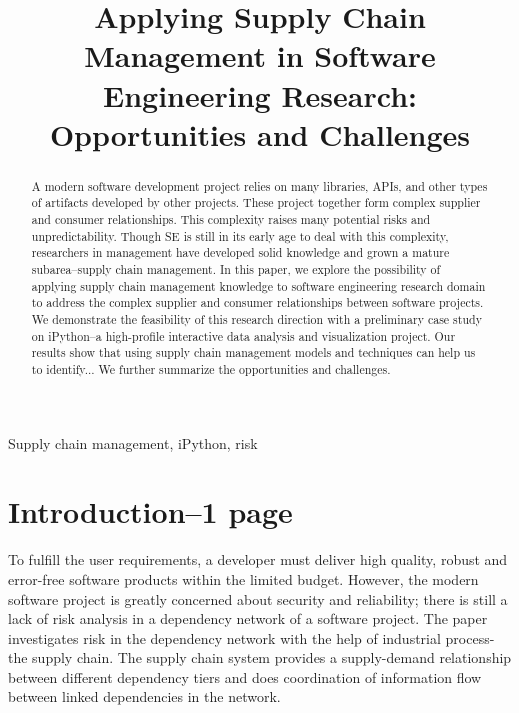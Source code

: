 \documentclass[10pt,conference]{IEEEtran}
\begin{document}
\title{Applying Supply Chain Management in Software Engineering Research: Opportunities and Challenges}
\author{}


\maketitle

\begin{abstract}
A modern software development project relies on many libraries, APIs, and other types of artifacts developed by other projects. These project together form complex supplier and consumer relationships. This complexity raises many potential risks and unpredictability. Though SE is still in its early age to deal with this complexity, researchers in management have developed solid knowledge and grown a mature subarea--supply chain management. In this paper, we explore the possibility of applying supply chain management knowledge to software engineering research domain to address the complex supplier and consumer relationships between software projects. We demonstrate the
feasibility of this research direction with a preliminary case study on iPython--a high-profile interactive data analysis and visualization project. Our results show that using supply chain management models and techniques can help us to identify... We further summarize the opportunities and challenges. 


\end{abstract}

\begin{IEEEkeywords}
Supply chain management, iPython, risk                                                                      
\end{IEEEkeywords}

\section{Introduction--1 page}
To fulfill the user requirements, a developer must deliver high quality, robust and error-free software products within the limited budget\cite{sofCom}. However, the modern software project is greatly concerned about security and reliability; there is still a lack of risk analysis in a dependency network of a software project. The paper investigates risk in the dependency network with the help of industrial process-the supply chain. The supply chain system provides a supply-demand relationship between different dependency tiers and does coordination of information flow between linked dependencies in the network.
\end{document}
